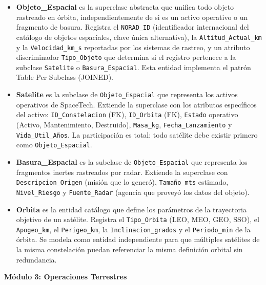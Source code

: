\begin{itemize}
    \item \textbf{Objeto\_Espacial} es la superclase abstracta que unifica todo objeto rastreado en órbita, independientemente de si es un activo operativo o un fragmento de basura. Registra el \texttt{NORAD\_ID} (identificador internacional del catálogo de objetos espaciales, clave única alternativa), la \texttt{Altitud\_Actual\_km} y la \texttt{Velocidad\_km\_s} reportadas por los sistemas de rastreo, y un atributo discriminador \texttt{Tipo\_Objeto} que determina si el registro pertenece a la subclase \texttt{Satelite} o \texttt{Basura\_Espacial}. Esta entidad implementa el patrón Table Per Subclass (JOINED).
    \item \textbf{Satelite} es la subclase de \texttt{Objeto\_Espacial} que representa los activos operativos de SpaceTech. Extiende la superclase con los atributos específicos del activo: \texttt{ID\_Constelacion} (FK), \texttt{ID\_Orbita} (FK), \texttt{Estado} operativo (Activo, Mantenimiento, Destruido), \texttt{Masa\_kg}, \texttt{Fecha\_Lanzamiento} y \texttt{Vida\_Util\_Años}. La participación es total: todo satélite debe existir primero como \texttt{Objeto\_Espacial}.
    \item \textbf{Basura\_Espacial} es la subclase de \texttt{Objeto\_Espacial} que representa los fragmentos inertes rastreados por radar. Extiende la superclase con \texttt{Descripcion\_Origen} (misión que lo generó), \texttt{Tamaño\_mts} estimado, \texttt{Nivel\_Riesgo} y \texttt{Fuente\_Radar} (agencia que proveyó los datos del objeto).
    \item \textbf{Orbita} es la entidad catálogo que define los parámetros de la trayectoria objetivo de un satélite. Registra el \texttt{Tipo\_Orbita} (LEO, MEO, GEO, SSO), el \texttt{Apogeo\_km}, el \texttt{Perigeo\_km}, la \texttt{Inclinacion\_grados} y el \texttt{Periodo\_min} de la órbita. Se modela como entidad independiente para que múltiples satélites de la misma constelación puedan referenciar la misma definición orbital sin redundancia.
\end{itemize}

\vspace{0.5cm}
\noindent \textbf{Módulo 3: Operaciones Terrestres}

